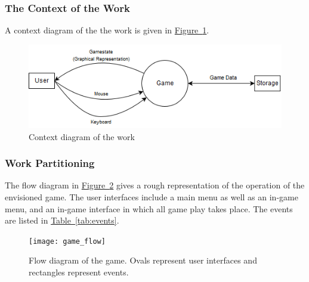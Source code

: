 \documentclass[12pt, titlepage]{article}
\begin{document}
\subsubsection{The Context of the Work}
A context diagram of the the work is given in \hyperref[fig:context]{Figure~\ref*{fig:context}}.

\begin{figure}[hb]
\includegraphics[width=\textwidth]{context}
\caption{Context diagram of the work} \label{fig:context}
\end{figure}
\FloatBarrier

\subsubsection{Work Partitioning}
The flow diagram in \hyperref[fig:gameflow]{Figure~\ref*{fig:gameflow}} gives a rough representation of the operation of the envisioned game.  The user interfaces include a main menu as well as an in-game menu, and an in-game interface in which all game play takes place.  The events are listed in \hyperref[tab:events]{Table~\ref*{tab:events}}.
\begin{figure}
\texttt{[image: game\_flow]}
\caption[Flow diagram of the game]{Flow diagram of the game.  Ovals represent user interfaces and rectangles represent events.} \label{fig:gameflow}
\end{figure}
\end{document}
